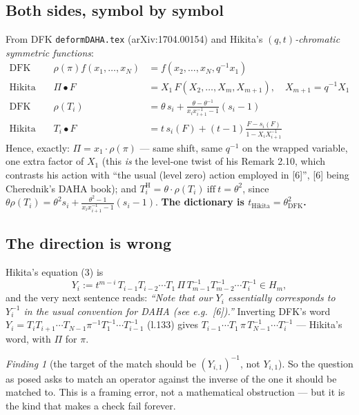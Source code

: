 \documentclass[11pt]{article}
\theoremstyle{remark}
\newtheorem{finding}{Finding}
\begin{document}
\subsection{Both sides, symbol by symbol}
From DFK \texttt{deformDAHA.tex} (arXiv:1704.00154) and Hikita's \emph{$(q,t)$-chromatic
symmetric functions}:
\begin{align*}
\text{DFK l.132:}&& \rho(\pi)f(x_1,\dots,x_N)&=f(x_2,\dots,x_N,q^{-1}x_1)\\
\text{Hikita (2):}&& \Pi\bullet F&=X_1\,F(X_2,\dots,X_m,X_{m+1}),\quad X_{m+1}=q^{-1}X_1\\[1mm]
\text{DFK l.127:}&& \rho(T_i)&=\theta\,s_i+\tfrac{\theta-\theta^{-1}}{x_ix_{i+1}^{-1}-1}(s_i-1)\\
\text{Hikita (1):}&& T_i\bullet F&=t\,s_i(F)+(t-1)\tfrac{F-s_i(F)}{1-X_iX_{i+1}^{-1}}
\end{align*}
Hence, exactly: $\boxed{\Pi=x_1\cdot\rho(\pi)}$ --- same shift, same $q^{-1}$ on the wrapped
variable, one extra factor of $X_1$ (this \emph{is} the level-one twist of his Remark 2.10, which
contrasts his action with ``the usual (level zero) action employed in [6]'', [6] being
Cherednik's DAHA book); and $\boxed{T^{\mathrm H}_i=\theta\cdot\rho(T_i)\ \text{iff}\
t=\theta^2}$, since
$\theta\rho(T_i)=\theta^2s_i+\frac{\theta^2-1}{x_ix_{i+1}^{-1}-1}(s_i-1)$.
\textbf{The dictionary is $t_{\text{Hikita}}=\theta_{\mathrm{DFK}}^2$.}

\subsection{The direction is wrong}
Hikita's equation (3) is
\[ Y_i:=t^{m-i}\,T_{i-1}T_{i-2}\cdots T_1\,\Pi\,T_{m-1}^{-1}T_{m-2}^{-1}\cdots T_i^{-1}\in H_m, \]
and the very next sentence reads: \emph{``Note that our $Y_i$ essentially corresponds to
$Y_i^{-1}$ in the usual convention for DAHA (see e.g.~[6]).''} Inverting DFK's word
$Y_i=T_iT_{i+1}\cdots T_{N-1}\pi^{-1}T_1^{-1}\cdots T_{i-1}^{-1}$ (l.133) gives
$T_{i-1}\cdots T_1\,\pi\,T_{N-1}^{-1}\cdots T_i^{-1}$ --- Hikita's word, with $\Pi$ for $\pi$.
\begin{finding}[the target of the match should be $(Y_{i,1})^{-1}$, not $Y_{i,1}$]
So the question as posed asks to match an operator against the inverse of the one it should be
matched to. This is a framing error, not a mathematical obstruction --- but it is the kind that
makes a check fail forever.
\end{finding}
\end{document}
